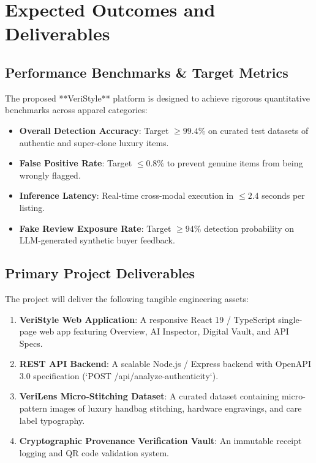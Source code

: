\chapter{Expected Outcomes and Deliverables}

\section{Performance Benchmarks & Target Metrics}
The proposed **VeriStyle** platform is designed to achieve rigorous quantitative benchmarks across apparel categories:
\begin{itemize}
    \item \textbf{Overall Detection Accuracy}: Target $\ge 99.4\%$ on curated test datasets of authentic and super-clone luxury items.
    \item \textbf{False Positive Rate}: Target $\le 0.8\%$ to prevent genuine items from being wrongly flagged.
    \item \textbf{Inference Latency}: Real-time cross-modal execution in $\le 2.4$ seconds per listing.
    \item \textbf{Fake Review Exposure Rate}: Target $\ge 94\%$ detection probability on LLM-generated synthetic buyer feedback.
\end{itemize}

\section{Primary Project Deliverables}
The project will deliver the following tangible engineering assets:
\begin{enumerate}
    \item \textbf{VeriStyle Web Application}: A responsive React 19 / TypeScript single-page web app featuring Overview, AI Inspector, Digital Vault, and API Specs.
    \item \textbf{REST API Backend}: A scalable Node.js / Express backend with OpenAPI 3.0 specification (`POST /api/analyze-authenticity`).
    \item \textbf{VeriLens Micro-Stitching Dataset}: A curated dataset containing micro-pattern images of luxury handbag stitching, hardware engravings, and care label typography.
    \item \textbf{Cryptographic Provenance Verification Vault}: An immutable receipt logging and QR code validation system.
\end{enumerate}


